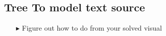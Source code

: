 \newpage
\hypertarget{treeToModel tex}{}
\subsection{Tree To model text source}
\texHeader

\begin{itemize}



\item[$\blacktriangleright$] Figure out how to do from your solved visual


\end{itemize}
